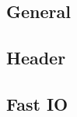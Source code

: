 \documentclass[10pt]{article}
\begin{document}
\begin{multicols}{3}

\tableofcontents
\section{General}
\subsection{Header}

\subsection{Fast IO}


\end{multicols}
\end{document}
